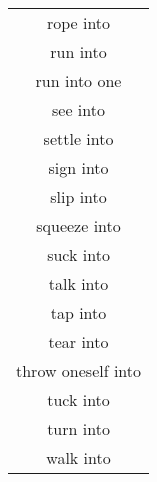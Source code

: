 \begin{longtable}{c}
rope into \\
run into \\
run into one \\
see into \\
settle into \\
sign into \\
slip into \\
squeeze into \\
suck into \\
talk into \\
tap into \\
tear into \\
throw oneself into \\
tuck into \\
turn into \\
walk into \\
\bottomrule
\midrule
\end{longtable}

